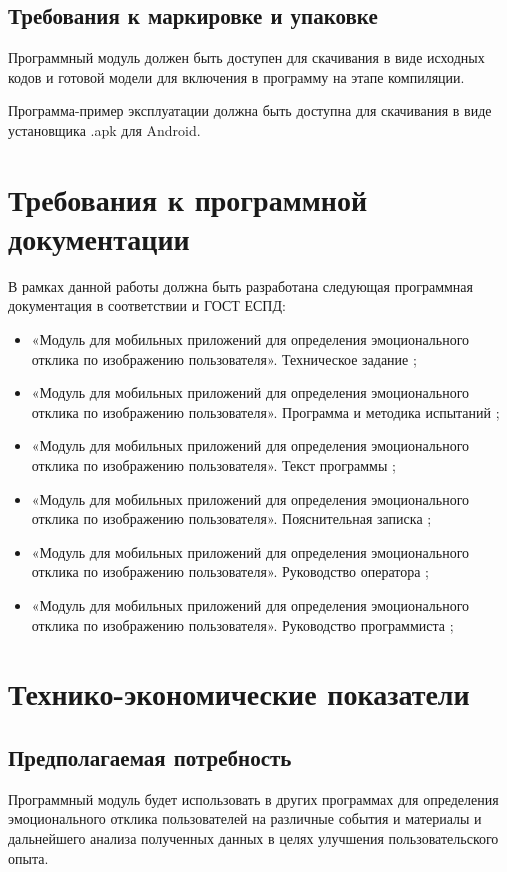 \documentclass[a4paper,12pt,reqno]{article}
\begin{document}
    \subsection{Требования к маркировке и упаковке}
    Программный модуль должен быть доступен для скачивания в виде исходных кодов и готовой модели для включения в программу на этапе компиляции.

    Программа-пример эксплуатации должна быть доступна для скачивания в виде установщика .apk для Android.

    \newpage
    \section{Требования к программной документации}
    В рамках данной работы должна быть разработана следующая программная документация в соответствии и ГОСТ ЕСПД:
    \begin{itemize}
        \item «Модуль для мобильных приложений для определения эмоционального отклика по изображению пользователя». Техническое задание \cite{TZ};
        \item «Модуль для мобильных приложений для определения эмоционального отклика по изображению пользователя». Программа и методика испытаний \cite{TEST};
        \item «Модуль для мобильных приложений для определения эмоционального отклика по изображению пользователя». Текст программы \cite{TEXT};
        \item «Модуль для мобильных приложений для определения эмоционального отклика по изображению пользователя». Пояснительная записка \cite{NOTE};
        \item «Модуль для мобильных приложений для определения эмоционального отклика по изображению пользователя». Руководство оператора \cite{MANUAL};
        \item «Модуль для мобильных приложений для определения эмоционального отклика по изображению пользователя». Руководство программиста \cite{PROG};
    \end{itemize}

    \newpage
    \section{Технико-экономические показатели}
    \subsection{Предполагаемая потребность}
    Программный модуль будет использовать в других программах для определения эмоционального отклика пользователей на различные события и материалы и дальнейшего анализа полученных данных в целях улучшения пользовательского опыта.
\end{document}
